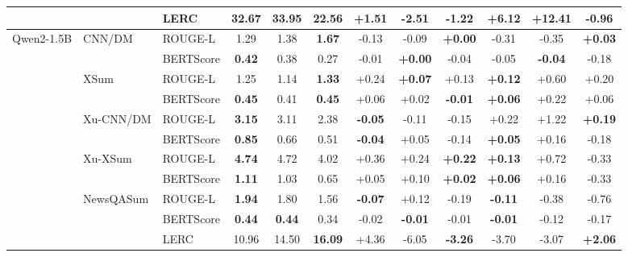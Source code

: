 \begin{table}[b]
{\begin{tabular}{lll|ccc|cccccc}
 &  & LERC & 32.67 & \textbf{33.95} & 22.56 & +1.51 & -2.51 & \textbf{-1.22} & +6.12 & +12.41 & \textbf{-0.96} \\
\midrule
\multirow{11}{*}{Qwen2-1.5B} & \multirow{2}{*}{CNN/DM} & ROUGE-L & 1.29 & 1.38 & \textbf{1.67} & -0.13 & -0.09 & \textbf{+0.00} & -0.31 & -0.35 & \textbf{+0.03} \\
 &  & BERTScore & \textbf{0.42} & 0.38 & 0.27 & -0.01 & \textbf{+0.00} & -0.04 & -0.05 & \textbf{-0.04} & -0.18 \\
\cmidrule(lr){2-12}
 & \multirow{2}{*}{XSum} & ROUGE-L & 1.25 & 1.14 & \textbf{1.33} & +0.24 & \textbf{+0.07} & +0.13 & \textbf{+0.12} & +0.60 & +0.20 \\
 &  & BERTScore & \textbf{0.45} & 0.41 & \textbf{0.45} & +0.06 & +0.02 & \textbf{-0.01} & \textbf{+0.06} & +0.22 & +0.06 \\
\cmidrule(lr){2-12}
 & \multirow{2}{*}{Xu-CNN/DM} & ROUGE-L & \textbf{3.15} & 3.11 & 2.38 & \textbf{-0.05} & -0.11 & -0.15 & +0.22 & +1.22 & \textbf{+0.19} \\
 &  & BERTScore & \textbf{0.85} & 0.66 & 0.51 & \textbf{-0.04} & +0.05 & -0.14 & \textbf{+0.05} & +0.16 & -0.18 \\
\cmidrule(lr){2-12}
 & \multirow{2}{*}{Xu-XSum} & ROUGE-L & \textbf{4.74} & 4.72 & 4.02 & +0.36 & +0.24 & \textbf{+0.22} & \textbf{+0.13} & +0.72 & -0.33 \\
 &  & BERTScore & \textbf{1.11} & 1.03 & 0.65 & +0.05 & +0.10 & \textbf{+0.02} & \textbf{+0.06} & +0.16 & -0.33 \\
\cmidrule(lr){2-12}
 & \multirow{3}{*}{NewsQASum} & ROUGE-L & \textbf{1.94} & 1.80 & 1.56 & \textbf{-0.07} & +0.12 & -0.19 & \textbf{-0.11} & -0.38 & -0.76 \\
 &  & BERTScore & \textbf{0.44} & \textbf{0.44} & 0.34 & -0.02 & \textbf{-0.01} & -0.01 & \textbf{-0.01} & -0.12 & -0.17 \\
 &  & LERC & 10.96 & 14.50 & \textbf{16.09} & +4.36 & -6.05 & \textbf{-3.26} & -3.70 & -3.07 & \textbf{+2.06} \\
\bottomrule
\end{tabular}
}
\end{table}
